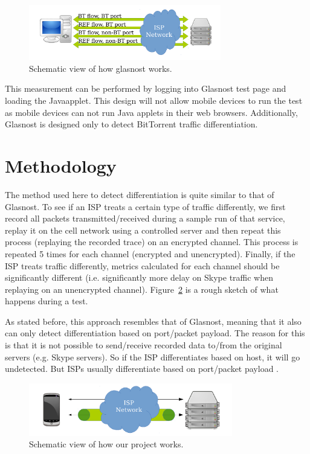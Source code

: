 \documentclass[letterpaper]{sig-alternate-10pt}
\begin{document}
\begin{figure}[ht]
\centering
\includegraphics[width=3.3in]{figures/glasnost}
\caption{Schematic view of how glasnost works.}
\label{fig:glasnost}
\end{figure}

This measurement can be performed by logging into Glasnost test page and loading the Java\texttrademark applet. This design will not allow mobile devices to run the test as mobile devices can not run Java applets in their web browsers. Additionally, Glasnost is designed only to detect BitTorrent traffic differentiation.

\section{Methodology}
\label{sec:method}

The method used here to detect differentiation is quite similar to that of Glasnost. To see if an ISP treats a certain type of traffic differently, we first record all packets transmitted/received during a sample run of that service, replay it on the cell network using a controlled server and then repeat this process (replaying the recorded trace) on an encrypted channel. This process is repeated 5 times for each channel (encrypted and unencrypted). Finally, if the ISP treats traffic differently, metrics calculated for each channel should be significantly different (i.e. significantly more delay on 
Skype traffic when replaying on an unencrypted channel). Figure~\ref{fig:meddle} is a rough sketch of what happens during a test.

As stated before, this approach resembles that of Glasnost, meaning that it also can only detect differentiation based on port/packet payload. The reason for this is that it is not possible to send/receive recorded data to/from the original servers (e.g. Skype servers). So if the ISP differentiates based on host, it will go undetected. But ISPs usually differentiate based on port/packet payload \cite{glasnost}.

\begin{figure}[ht]
\centering
\includegraphics[width=3.5in]{figures/meddle}
\caption{Schematic view of how our project works.}
\label{fig:meddle}
\end{figure}
\end{document}
